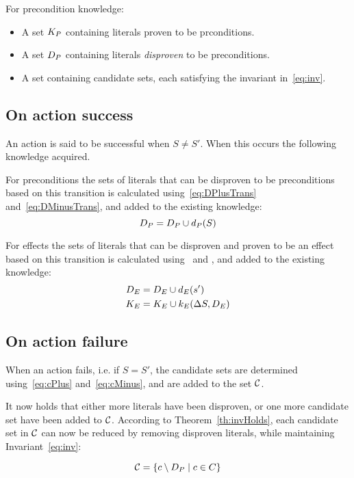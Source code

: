 \documentclass[\master/Master.tex]{subfiles}
\begin{document}
For precondition knowledge:
\begin{itemize}
    \item A set $K_P$ containing literals proven to be prconditions.
	\item A set $D_P$ containing literals \emph{disproven} to be preconditions.
    \item A set \cset containing candidate sets, each satisfying the invariant in~\eqref{eq:inv}.
\end{itemize}

\subsection*{On action success}
An action is said to be successful when $S \neq S'$. When this occurs the following knowledge acquired.

For preconditions the sets of literals that can be disproven to be preconditions based on this transition is calculated using~\eqref{eq:DPlusTrans} and~\eqref{eq:DMinusTrans}, and added to the existing knowledge:
\begin{equation*}
    D_P = D_P \cup d_P(S)
\end{equation*}

For effects the sets of literals that can be disproven and proven to be an effect based on this transition is calculated using~ and , and added to the existing knowledge:
\begin{align*}
D_E &= D_E \cup d_E(s') \\
K_E &= K_E \cup k_E(\Delta S, D_E)
\end{align*}


\subsection*{On action failure}

When an action fails, i.e. if $S = S'$, the candidate sets are determined using~\eqref{eq:cPlus} and~\eqref{eq:cMinus}, and are added to the set $\mathcal{C}$.

It now holds that either more literals have been disproven, or one more candidate set have been added to $\mathcal{C}$. According to Theorem~\ref{th:invHolds}, each candidate set in $\mathcal{C}$ can now be reduced by removing disproven literals, while maintaining Invariant~\eqref{eq:inv}:

\begin{equation} \label{reduceCands}
    \mathcal{C} = \left\{ c \setminus D_P \; | \; c \in C \right\}
\end{equation}
\end{document}
